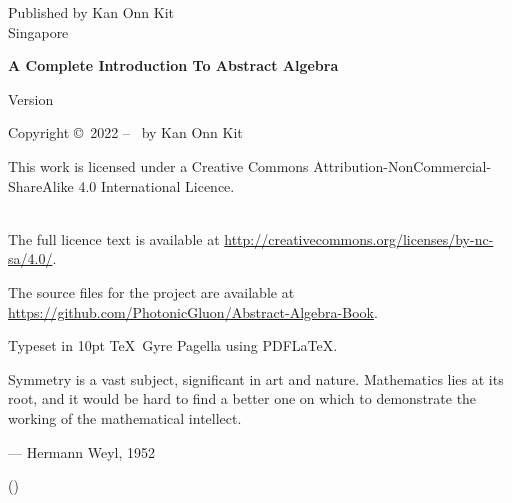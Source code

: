 \clearpage\null\vfill
\thispagestyle{empty}
\begin{minipage}[b]{0.9\textwidth}
    \footnotesize\raggedright
    \setlength{\parskip}{0.5\baselineskip}

    Published by Kan Onn Kit\\
    Singapore
    \vspace{5cm}

    \textbf{A Complete Introduction To Abstract Algebra}\par
    Version \version
    \vspace{0.3cm}

    Copyright \copyright \ 2022 -- \the\year\ by Kan Onn Kit\par
    This work is licensed under a
    Creative Commons Attribution-NonCommercial-ShareAlike 4.0 International Licence.\par
    \\
    The full licence text is available at \url{http://creativecommons.org/licenses/by-nc-sa/4.0/}.\par    
    The source files for the project are available at \url{https://github.com/PhotonicGluon/Abstract-Algebra-Book}.
    \vspace{0.3cm}

    Typeset in 10pt \TeX~Gyre Pagella using PDF\LaTeX.
\end{minipage}

\vspace*{2\baselineskip}
\cleardoublepage

\thispagestyle{empty}
\vspace*{2cm}

\begin{center}
    \Large{\parbox{10cm}{
        \begin{raggedright}
            \Large
            Symmetry is a vast subject, significant in art and nature. Mathematics lies at its root, and it would be hard to find a better one on which to demonstrate the working of the mathematical intellect.
            \vspace{0.3cm}
            
            \hfill
            --- Hermann Weyl, 1952\\
            \vspace{-0.25cm}
            
            \hfill
            \normalsize
            ({\cite[p.~145]{weyl_1952}})
        \end{raggedright}
    }
}
\end{center}

